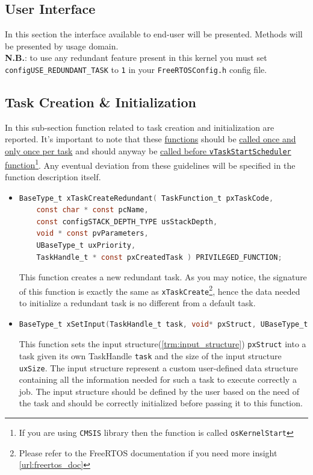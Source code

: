 \documentclass[a4paper, 12pt]{article}
\begin{document}
\begin{onehalfspace}
\section{User Interface} \label{section:User Interface}
In this section the interface available to end-user will be presented. Methods will be presented by usage domain.\\
\textbf{N.B.}: to use any redundant feature present in this kernel you must set \texttt{configUSE\_REDUNDANT\_TASK} to \texttt{1} in your \texttt{FreeRTOSConfig.h} config file.
\subsection{Task Creation \& Initialization}
In this sub-section function related to task creation and initialization are reported. It's important to note that these \underline{functions} should be \underline{called once and only once per task} and should anyway be \underline{called before \texttt{vTaskStartScheduler} function}\footnote{If you are using \texttt{CMSIS} library then the function is called \texttt{osKernelStart}}. Any eventual deviation from these guidelines will be specified in the function description itself.
\begin{itemize}
    \item \label{task_creator}{
        \begin{lstlisting}[language=C]
BaseType_t xTaskCreateRedundant( TaskFunction_t pxTaskCode,
    const char * const pcName,
    const configSTACK_DEPTH_TYPE usStackDepth,
    void * const pvParameters,
    UBaseType_t uxPriority,
    TaskHandle_t * const pxCreatedTask ) PRIVILEGED_FUNCTION;
        \end{lstlisting}
        This function creates a new redundant task. As you may notice, the signature of this function is exactly the same as \texttt{xTaskCreate}\footnote{Please refer to the FreeRTOS documentation if you need more insight  \ref{url:freertos_doc}}, hence the data needed to initialize a redundant task is no different from a default task.
    }
    \item {
        \begin{lstlisting}[language=C]
BaseType_t xSetInput(TaskHandle_t task, void* pxStruct, UBaseType_t uxSize);
        \end{lstlisting}
        This function sets the input structure(\ref{trm:input_structure}) \texttt{pxStruct} into a task given its own TaskHandle \texttt{task} and the size of the input structure \texttt{uxSize}. The input structure represent a custom user-defined data structure containing all the information needed for such a task to execute correctly a job. The input structure should be defined by the user based on the need of the task and should be correctly initialized before passing it to this function.
}
\end{itemize}
\end{onehalfspace}
\end{document}
